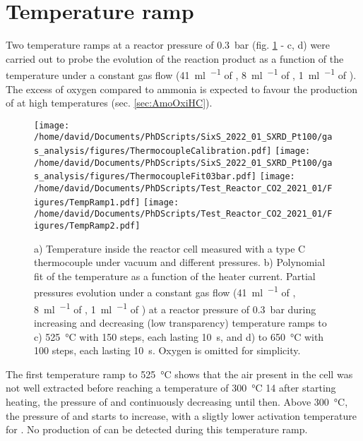 \section{Temperature ramp}\label{sec:TempRampBCDI}


Two temperature ramps at a reactor pressure of \qty{0.3}{\bar} (fig. \ref{fig:TempRamps} - c, d) were carried out to probe the evolution of the reaction product as a function of the temperature under a constant gas flow (\qty{41}{\ml\per\min} of \argon, \qty{8}{\ml\per\min} of \dioxygen, \qty{1}{\ml\per\min} of \ammonia).
The excess of oxygen compared to ammonia is expected to favour the production of \nitricoxide at high temperatures (sec. \ref{sec:AmoOxiHC}).

\begin{figure}[!htb]
    \centering
    \texttt{[image: /home/david/Documents/PhDScripts/SixS\_2022\_01\_SXRD\_Pt100/gas\_analysis/figures/ThermocoupleCalibration.pdf]}
    \texttt{[image: /home/david/Documents/PhDScripts/SixS\_2022\_01\_SXRD\_Pt100/gas\_analysis/figures/ThermocoupleFit03bar.pdf]}
    \texttt{[image: /home/david/Documents/PhDScripts/Test\_Reactor\_CO2\_2021\_01/Figures/TempRamp1.pdf]}
    \texttt{[image: /home/david/Documents/PhDScripts/Test\_Reactor\_CO2\_2021\_01/Figures/TempRamp2.pdf]}
    \caption{
        a) Temperature inside the reactor cell measured with a type C thermocouple under vacuum and different \argon pressures.
        b) Polynomial fit of the temperature as a function of the heater current.
        Partial pressures evolution under a constant gas flow (\qty{41}{\ml\per\min} of \argon, \qty{8}{\ml\per\min} of \dioxygen, \qty{1}{\ml\per\min} of \ammonia) at a reactor pressure of \qty{0.3}{\bar} during increasing and decreasing (low transparency) temperature ramps to c) \qty{525}{\degreeCelsius} with 150 steps, each lasting \qty{10}{\second}, and d) to \qty{650}{\degreeCelsius} with 100 steps, each lasting \qty{10}{\second}.
        Oxygen is omitted for simplicity.
    }
    \label{fig:TempRamps}
\end{figure}

The first temperature ramp to \qty{525}{\degreeCelsius} shows that the air present in the cell was not well extracted before reaching a temperature of \qty{300}{\degreeCelsius} \qty{14}{\min} after starting heating, the pressure of \nitrogen and \water continuously decreasing until then.
Above \qty{300}{\degreeCelsius}, the pressure of \nitrogen and \nitricoxide starts to increase, with a sligtly lower activation temperature for \nitrogen.
No production of \nitrousoxide can be detected during this temperature ramp.

